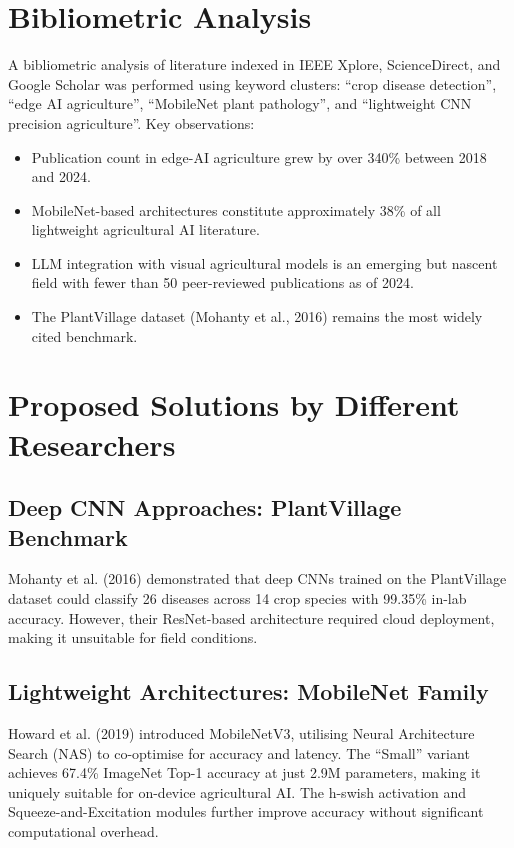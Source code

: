 \documentclass[12pt,oneside]{report}
\begin{document}
\section{Bibliometric Analysis}
A bibliometric analysis of literature indexed in IEEE Xplore, ScienceDirect, and Google Scholar was performed using keyword clusters: ``crop disease detection'', ``edge AI agriculture'', ``MobileNet plant pathology'', and ``lightweight CNN precision agriculture''. Key observations:

\begin{itemize}
    \item Publication count in edge-AI agriculture grew by over 340\% between 2018 and 2024.
    \item MobileNet-based architectures constitute approximately 38\% of all lightweight agricultural AI literature.
    \item LLM integration with visual agricultural models is an emerging but nascent field with fewer than 50 peer-reviewed publications as of 2024.
    \item The PlantVillage dataset (Mohanty et al., 2016) remains the most widely cited benchmark.
\end{itemize}

\section{Proposed Solutions by Different Researchers}

\subsection{Deep CNN Approaches: PlantVillage Benchmark}
Mohanty et al. (2016) demonstrated that deep CNNs trained on the PlantVillage dataset could classify 26 diseases across 14 crop species with 99.35\% in-lab accuracy. However, their ResNet-based architecture required cloud deployment, making it unsuitable for field conditions.

\subsection{Lightweight Architectures: MobileNet Family}
Howard et al. (2019) introduced MobileNetV3, utilising Neural Architecture Search (NAS) to co-optimise for accuracy and latency. The ``Small'' variant achieves 67.4\% ImageNet Top-1 accuracy at just 2.9M parameters, making it uniquely suitable for on-device agricultural AI. The h-swish activation and Squeeze-and-Excitation modules further improve accuracy without significant computational overhead.
\end{document}
